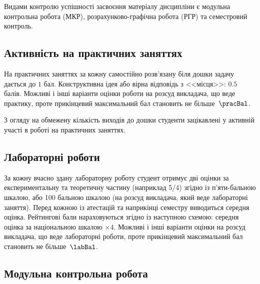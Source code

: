 \documentclass{Syllabus}
\begin{document}
%

Видами контролю успішності засвоєння матеріалу дисципліни є  модульна контрольна робота (МКР), розрахунково-графічна робота (РГР) та семестровий контроль.


\subsection*{Активність на практичних заняттях}

На практичних заняттях за кожну самостійно розв’язану біля дошки задачу дається до $1$ бал. Конструктивна ідея або вірна відповідь з <<місця>>: $0.5$ балів. Можливі і інші варіанти оцінки роботи на розсуд викладача, що веде практику, проте прикінцевий максимальний бал становить не більше~$\pracBal$.

З огляду на обмежену кількість виходів до дошки студенти зацікавлені у активній участі в роботі на практичних заняттях.

\subsection*{Лабораторні роботи}

За кожну вчасно здану лабораторну роботу студент отримує дві оцінки за експериментальну та теоретичну частину (наприклад 5/4) згідно із п'яти-бальною шкалою, або 100 бальною шкалою (на розсуд викладача, який веде лабораторні заняття). Перед кожною із атестацій та наприкінці семестру виводиться середня оцінка. Рейтингові бали нараховуються згідно із наступною схемою: середня оцінка за національною шкалою $\times 4$. Можливі і інші варіанти оцінки на розсуд викладача, що веде лабораторні роботи, проте прикінцевий максимальний бал становить не більше~$\labBal$.



\subsection*{Модульна контрольна робота}
\end{document}
